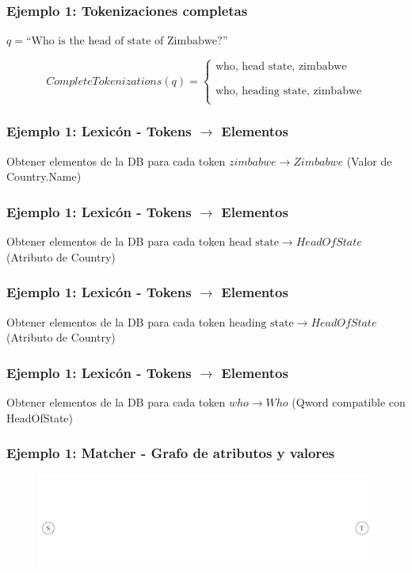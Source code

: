 \begin{frame}
\frametitle{Ejemplo 1: Tokenizaciones completas}

\begin{center}

$q = \text{``Who is the head of state of Zimbabwe?''}$
\end{center}
 \begin{equation*}
    CompleteTokenizations(q) = \begin{cases}
               \text{who, head state, zimbabwe} \\
               \\
               \\
               \text{who, heading state, zimbabwe} \\
           \end{cases}
\end{equation*}

\end{frame}

\begin{frame}[t]
\frametitle{Ejemplo 1: Lexicón - Tokens $\rightarrow$ Elementos}
Obtener elementos de la DB para cada token\newline
  \Large{
    $zimbabwe \rightarrow Zimbabwe$ (Valor de Country.Name)
    }
\end{frame}

\begin{frame}[t]
\frametitle{Ejemplo 1: Lexicón - Tokens $\rightarrow$ Elementos}
Obtener elementos de la DB para cada token\newline
  \Large{
    $\text{head state} \rightarrow HeadOfState$ (Atributo de Country)
    }
\end{frame}

\begin{frame}[t]
\frametitle{Ejemplo 1: Lexicón - Tokens $\rightarrow$ Elementos}
Obtener elementos de la DB para cada token\newline
  \Large{
    $\text{heading state} \rightarrow HeadOfState$ (Atributo de Country)
    }
\end{frame}

\begin{frame}[t]
\frametitle{Ejemplo 1: Lexicón - Tokens $\rightarrow$ Elementos}
Obtener elementos de la DB para cada token\newline
  \Large{
    $who \rightarrow Who$ (Qword compatible con HeadOfState)
    }
\end{frame}

\begin{frame}
\frametitle{Ejemplo 1: Matcher - Grafo de atributos y valores}
\begin{figure}
  \centering
    \includegraphics[scale=.33]{graficos/presentacion/ejemplo-grafo-matcher-1-2}
\end{figure}
\end{frame}

